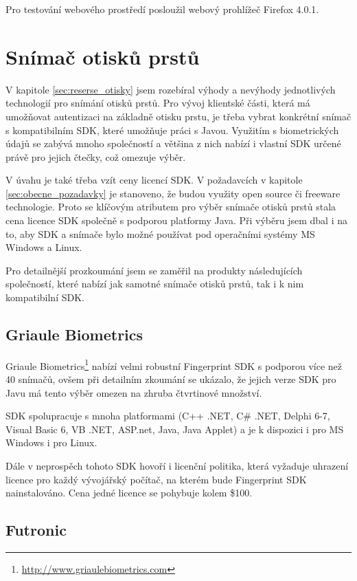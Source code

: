 \documentclass[11pt,twoside,a4paper]{book}
\begin{document}
Pro testování webového prostředí posloužil webový prohlížeč Firefox 4.0.1.

\section{Snímač otisků prstů}

V kapitole \ref{sec:reserse_otisky} jsem rozebíral výhody a nevýhody jednotlivých technologií pro snímání otisků prstů. Pro vývoj klientské části, která má umožňovat autentizaci na základně otisku prstu, je třeba vybrat konkrétní snímač s kompatibilním SDK, které umožňuje práci s Javou. Využitím s biometrických údajů se zabývá mnoho společností a většina z nich nabízí i vlastní SDK určené právě pro jejich čtečky, což omezuje výběr. 

V úvahu je také třeba vzít ceny licencí SDK. V požadavcích v kapitole \ref{sec:obecne_pozadavky} je stanoveno, že budou využity open source či freeware technologie. Proto se klíčovým atributem pro výběr snímače otisků prstů stala cena licence SDK společně s podporou platformy Java. Při výběru jsem dbal i na to, aby SDK a snímače bylo možné používat pod operačními systémy MS Windows a Linux.

Pro detailnější prozkoumání jsem se zaměřil na produkty následujících společností, které nabízí jak samotné snímače otisků prstů, tak i k nim kompatibilní SDK.

\subsection{Griaule Biometrics}

Griaule Biometrics\footnote{\url{http://www.griaulebiometrics.com}} nabízí velmi robustní Fingerprint SDK s podporou více než 40 snímačů, ovšem při detailním zkoumání se ukázalo, že jejich verze SDK pro Javu má tento výběr omezen na zhruba čtvrtinové množství. 

SDK spolupracuje s mnoha platformami (C++ .NET, C\# .NET, Delphi 6-7, Visual Basic 6, VB .NET, ASP.net, Java, Java Applet) a je k dispozici i pro MS Windows i pro Linux. 

Dále v neprospěch tohoto SDK hovoří i licenční politika, která vyžaduje uhrazení licence pro každý vývojářský počítač, na kterém bude Fingerprint SDK nainstalováno. Cena jedné licence se pohybuje kolem \$100.

\subsection{Futronic}
\end{document}
